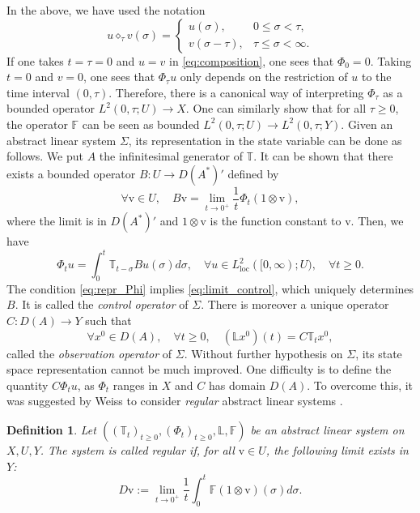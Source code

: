 \documentclass[10pt]{article}
\newcommand{\oploc}{\operatorname{loc}}
\newtheorem{Definition}[Theorem]{Definition}
\begin{document}
In the above, we have used the notation
\[
u \diamond_\tau v(\sigma) = \left\lbrace \begin{array}{lc}
    u(\sigma), & 0 \leq \sigma < \tau,  \\
    v(\sigma-\tau), & \tau \leq \sigma < \infty. 
\end{array}\right.
\]
If one takes $t=\tau = 0$ and $u = v$ in \eqref{eq:composition}, one sees that $\Phi_0 = 0$. Taking $t = 0$ and $v = 0$, one sees that $\Phi_\tau u$ only depends on the restriction of $u$ to the time interval $(0,\tau)$. Therefore, there is a canonical way of interpreting $\Phi_\tau$ as a bounded operator $L^2(0,\tau;U) \to X$. One can similarly show that for all $\tau \geq 0$, the operator $\mathbb{F}$ can be seen as bounded $L^2(0,\tau;U) \to L^2(0,\tau;Y)$. 
\newline
\newline
Given an abstract linear system $\Sigma$, its representation in the state variable can be done as follows. We put $A$ the infinitesimal generator of $\mathbb{T}$. It can be shown \cite[Theorem 3.9]{weiss_admissibility_control} that there exists a bounded operator $B : U \to D(A^*)'$ defined by 
\begin{equation}\label{eq:limit_control}
\forall \mathrm{v} \in U,\quad B\mathrm{v} = \lim_{t \to 0^+} \frac{1}{t} \Phi_t (1 \otimes  \mathrm{v}),    
\end{equation}
where the limit is in $D(A^*)'$ and $1 \otimes  \mathrm{v}$ is the function constant to $\mathrm{v}$. Then, we have 
\begin{equation}\label{eq:repr_Phi}
\Phi_t u = \int_0^t \mathbb{T}_{t-\sigma}Bu(\sigma)d\sigma,\quad \forall u \in L^2_{\oploc}([0,\infty);U),\quad \forall t \geq 0.     
\end{equation}
The condition \eqref{eq:repr_Phi} implies \eqref{eq:limit_control}, which uniquely determines $B$. It is called the \textit{control operator} of $\Sigma$. There is moreover a unique operator $C : D(A) \to Y$ such that 
\[
\forall x^0 \in D(A),\quad \forall t \geq 0,\quad (\mathbb{L}x^0)(t) = C \mathbb{T}_t x^0,
\]
called the \textit{observation operator} of $\Sigma$. Without further hypothesis on $\Sigma$, its state space representation cannot be much improved. One difficulty is to define the quantity $C \Phi_t u$, as $\Phi_t$ ranges in $X$ and $C$ has domain $D(A)$. To overcome this, it was suggested by Weiss to consider \textit{regular} abstract linear systems \cite{weiss_representation,weiss1994transfer}. 
\begin{Definition}
Let $((\mathbb{T}_t)_{t \geq 0},(\Phi_t)_{t \geq 0},\mathbb{L}, \mathbb{F})$ be an abstract linear system on $X,U,Y$. The system is called regular if, for all $\mathrm{v} \in U$, the following limit exists in $Y$: 
\begin{equation}\label{regularity}
D \mathrm{v} := \lim_{t \to 0^+} \frac{1}{t} \int_0^t \mathbb{F} (1 \otimes \mathrm{v})(\sigma)d\sigma. 
\end{equation}
\end{Definition}
\end{document}
